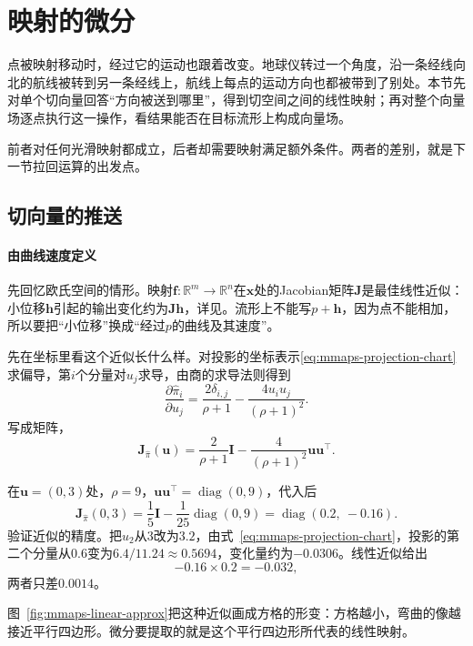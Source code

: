 \section{映射的微分}
\label{sec:mmaps-differentials}

点被映射移动时，经过它的运动也跟着改变。地球仪转过一个角度，沿一条经线向北的航线被转到另一条经线上，航线上每点的运动方向也都被带到了别处。本节先对单个切向量回答“方向被送到哪里”，得到切空间之间的线性映射；再对整个向量场逐点执行这一操作，看结果能否在目标流形上构成向量场。

前者对任何光滑映射都成立，后者却需要映射满足额外条件。两者的差别，就是下一节拉回运算的出发点。

\subsection{切向量的推送}
\label{sec:mmaps-tangent-pushforward}

\paragraph{由曲线速度定义}
先回忆欧氏空间的情形。映射$\bm f:\mathbb R^m\to\mathbb R^n$在$\bm x$处的Jacobian矩阵$\bm J$是最佳线性近似：小位移$\bm h$引起的输出变化约为$\bm J\bm h$，详见。流形上不能写$p+\bm h$，因为点不能相加，所以要把“小位移”换成“经过$p$的曲线及其速度”。

先在坐标里看这个近似长什么样。对投影的坐标表示\eqref{eq:mmaps-projection-chart}求偏导，第$i$个分量对$u_j$求导，由商的求导法则得到
\[
\frac{\partial\hat\pi_i}{\partial u_j}
=\frac{2\delta_{i,j}}{\rho+1}-\frac{4u_iu_j}{(\rho+1)^2}.
\]
写成矩阵，
\begin{equation}
\bm J_{\hat\pi}(\bm u)=\frac{2}{\rho+1}\bm I-\frac{4}{(\rho+1)^2}\bm u\bm u^\top .
\label{eq:mmaps-projection-jacobian}
\end{equation}

在$\bm u=(0,3)$处，$\rho=9$，$\bm u\bm u^\top=\operatorname{diag}(0,9)$，代入后
\[
\bm J_{\hat\pi}(0,3)=\frac15\bm I-\frac{1}{25}\operatorname{diag}(0,9)
=\operatorname{diag}(0.2,\ -0.16).
\]
验证近似的精度。把$u_2$从$3$改为$3.2$，由式~\eqref{eq:mmaps-projection-chart}，投影的第二个分量从$0.6$变为$6.4/11.24\approx0.5694$，变化量约为$-0.0306$。线性近似给出
\[
-0.16\times0.2=-0.032,
\]
两者只差$0.0014$。

图~\ref{fig:mmaps-linear-approx}把这种近似画成方格的形变：方格越小，弯曲的像越接近平行四边形。微分要提取的就是这个平行四边形所代表的线性映射。

